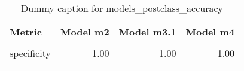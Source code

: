 \begin{table}
\centering
\caption{Dummy caption for models_postclass_accuracy}
\centering
\fontsize{10}{12}\selectfont
\begin{tabular}[t]{lrrr}
\toprule
Metric & Model m2 & Model m3.1 & Model m4\\
\midrule
\cellcolor{gray!10}{sensitivity} & \cellcolor{gray!10}{0.59} & \cellcolor{gray!10}{0.59} & \cellcolor{gray!10}{0.59}\\
specificity & 1.00 & 1.00 & 1.00\\
\cellcolor{gray!10}{overall\_accuracy} & \cellcolor{gray!10}{0.91} & \cellcolor{gray!10}{0.91} & \cellcolor{gray!10}{0.91}\\
\bottomrule
\end{tabular}
\end{table}

